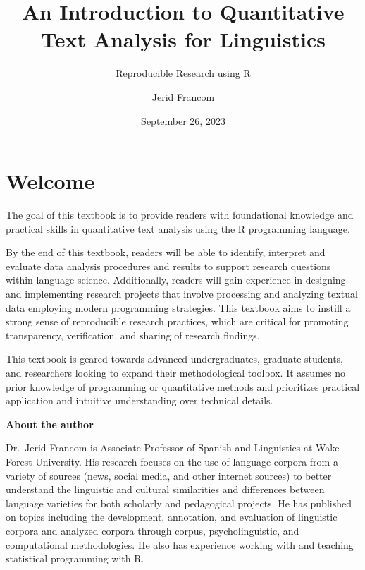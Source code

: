 \documentclass[
  letterpaper,
  DIV=11,
  numbers=noendperiod]{scrreport}
\title{An Introduction to Quantitative Text Analysis for Linguistics}
\subtitle{Reproducible Research using R}
\author{Jerid Francom}
\date{September 26, 2023}
\renewcommand*\contentsname{Table of contents}
\newcommand\contentsname{Table of contents}
\theoremstyle{definition}
\theoremstyle{remark}
\begin{document}
\maketitle
\ifdefined\Shaded\renewenvironment{Shaded}{\begin{tcolorbox}[boxrule=0pt, sharp corners, frame hidden, breakable, enhanced, colback={codebgcolor}, borderline west={3pt}{0pt}{shadecolor}]}{\end{tcolorbox}}\fi

\renewcommand*\contentsname{Table of contents}
{
\setcounter{tocdepth}{2}
\tableofcontents
}

\hypertarget{welcome}{%
\chapter*{Welcome}\label{welcome}}


The goal of this textbook is to provide readers with foundational
knowledge and practical skills in quantitative text analysis using the R
programming language.

By the end of this textbook, readers will be able to identify, interpret
and evaluate data analysis procedures and results to support research
questions within language science. Additionally, readers will gain
experience in designing and implementing research projects that involve
processing and analyzing textual data employing modern programming
strategies. This textbook aims to instill a strong sense of reproducible
research practices, which are critical for promoting transparency,
verification, and sharing of research findings.

This textbook is geared towards advanced undergraduates, graduate
students, and researchers looking to expand their methodological
toolbox. It assumes no prior knowledge of programming or quantitative
methods and prioritizes practical application and intuitive
understanding over technical details.

\textbf{About the author}

Dr.~Jerid Francom is Associate Professor of Spanish and Linguistics at
Wake Forest University. His research focuses on the use of language
corpora from a variety of sources (news, social media, and other
internet sources) to better understand the linguistic and cultural
similarities and differences between language varieties for both
scholarly and pedagogical projects. He has published on topics including
the development, annotation, and evaluation of linguistic corpora and
analyzed corpora through corpus, psycholinguistic, and computational
methodologies. He also has experience working with and teaching
statistical programming with R.
\end{document}
